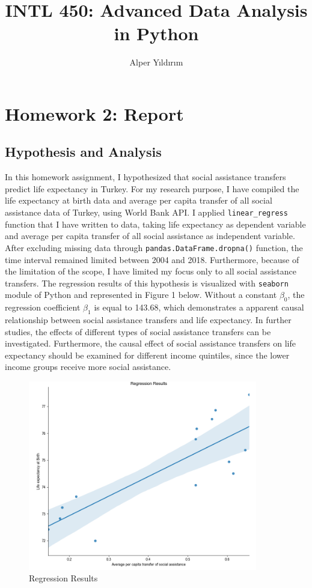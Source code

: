 \documentclass[a4paper]{article}
\title{INTL 450: Advanced Data Analysis in Python}
\author{Alper Yıldırım}
\begin{document}
\maketitle

\section{Homework 2: Report}

\subsection{Hypothesis and Analysis}
	In this homework assignment, I hypothesized that social assistance transfers predict life expectancy in Turkey. For my research purpose, I have compiled the life expectancy at birth data and average per capita transfer of all social assistance data of Turkey, using World Bank API. I applied \verb|linear_regress| function that I have written to data, taking life expectancy as dependent variable and average per capita transfer of all social assistance as independent variable. After excluding missing data through \verb|pandas.DataFrame.dropna()| function, the time interval remained limited between 2004 and 2018. Furthermore, because of the limitation of the scope, I have limited my focus only to all social assistance transfers. The regression results of this hypothesis is visualized with \verb|seaborn| module of Python and represented in Figure 1 below. Without a constant $\beta_0$, the regression coefficient $\beta_1$ is equal to 143.68, which demonstrates a apparent causal relationship between social assistance transfers and life expectancy. In further studies, the effects of different types of social assistance transfers can be investigated. Furthermore, the causal effect of social assistance transfers on life expectancy should be examined for different income quintiles, since the lower income groups receive more social assistance.

\begin{figure}[htp]
    \centering
    \includegraphics[width=10cm]{RegressionResults.png}
    \caption{Regression Results}
\end{figure}
\end{document}
